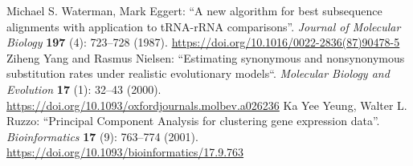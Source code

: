 \documentclass{report}
\begin{document}
\begin{thebibliography}{99}
Michael S. Waterman, Mark Eggert: ``A new algorithm for best subsequence alignments with application to tRNA-rRNA comparisons''. \textit{Journal of Molecular Biology} {\bf 197} (4): 723--728 (1987). \url{https://doi.org/10.1016/0022-2836(87)90478-5}
Ziheng Yang and Rasmus Nielsen: ``Estimating synonymous and nonsynonymous substitution rates under realistic evolutionary models``. \textit{Molecular Biology and Evolution} {\bf 17} (1): 32--43 (2000). \url{https://doi.org/10.1093/oxfordjournals.molbev.a026236}
Ka Yee Yeung, Walter L. Ruzzo: ``Principal Component Analysis for clustering gene expression data''. \textit{Bioinformatics} {\bf 17} (9): 763--774 (2001).
\url{https://doi.org/10.1093/bioinformatics/17.9.763}
\end{thebibliography}
\end{document}
